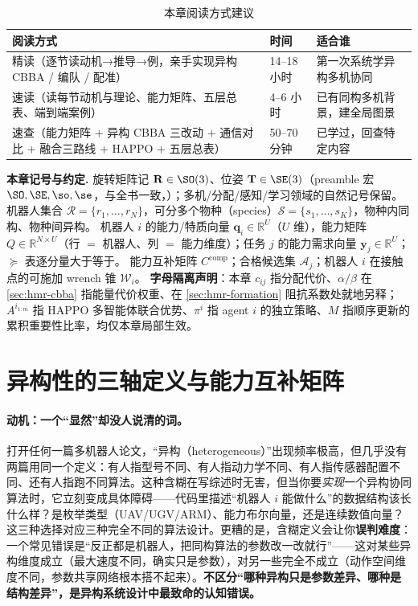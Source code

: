 \begin{table}[H]\centering\small
\caption{本章阅读方式建议}
\label{tab:hmr-reading}
\begin{tabularx}{\linewidth}{LlL}
\toprule
阅读方式 & 时间 & 适合谁 \\
\midrule
精读（逐节读动机→推导→例，亲手实现异构 CBBA / 编队 / 配准） & 14--18 小时 & 第一次系统学异构多机协同 \\
速读（读每节动机与理论、能力矩阵、五层总表、端到端案例） & 4--6 小时 & 已有同构多机背景，建全局图景 \\
速查（能力矩阵 $+$ 异构 CBBA 三改动 $+$ 通信对比 $+$ 融合三路线 $+$ HAPPO $+$ 五层总表） & 50--70 分钟 & 已学过，回查特定内容 \\
\bottomrule
\end{tabularx}
\end{table}

\begin{note}
\textbf{本章记号与约定.}\;
旋转矩阵记 $\mathbf{R}\in\SO(3)$、位姿 $\mathbf{T}\in\SE(3)$（preamble 宏 $\SO,\SE,\so,\se$，与全书一致，）；多机/分配/感知/学习领域的自然记号保留。
机器人集合 $\mathcal{R}=\{r_1,\dots,r_N\}$，可分多个物种（species）$\mathcal{S}=\{s_1,\dots,s_K\}$，物种内同构、物种间异构。
机器人 $i$ 的能力/特质向量 $\mathbf{q}_i\in\mathbb{R}^U$（$U$ 维），能力矩阵 $Q\in\mathbb{R}^{N\times U}$（行 $=$ 机器人、列 $=$ 能力维度）；任务 $j$ 的能力需求向量 $\mathbf{y}_j\in\mathbb{R}^U$；$\succeq$ 表逐分量大于等于。
能力互补矩阵 $C^{\mathrm{comp}}$；合格候选集 $\mathcal{A}_j$；机器人 $i$ 在接触点的可施加 wrench 锥 $\mathcal{W}_i$。
\textbf{字母隔离声明}：本章 $c_{ij}$ 指分配代价、$\alpha/\beta$ 在 \cref{sec:hmr-cbba} 指能量代价权重、在 \cref{sec:hmr-formation} 阻抗系数处就地另释；$A^{i_{1:m}}$ 指 HAPPO 多智能体联合优势、$\pi^i$ 指 agent $i$ 的独立策略、$M$ 指顺序更新的累积重要性比率，均仅本章局部生效。
\end{note}

\section{异构性的三轴定义与能力互补矩阵}
\label{sec:hmr-axes}

\paragraph{动机：一个“显然”却没人说清的词。}
打开任何一篇多机器人论文，“异构（heterogeneous）”出现频率极高，但几乎没有两篇用同一个定义：有人指型号不同、有人指动力学不同、有人指传感器配置不同、还有人指跑不同算法。这种含糊在写综述时无害，但当你要\emph{实现}一个异构协同算法时，它立刻变成具体障碍——代码里描述“机器人 $i$ 能做什么”的数据结构该长什么样？是枚举类型（UAV/UGV/ARM）、能力布尔向量，还是连续数值向量？这三种选择对应三种完全不同的算法设计。更糟的是，含糊定义会让你\textbf{误判难度}：一个常见错误是“反正都是机器人，把同构算法的参数改一改就行”——这对某些异构维度成立（最大速度不同，确实只是参数），对另一些完全不成立（动作空间维度不同，参数共享网络根本搭不起来）。\textbf{不区分“哪种异构只是参数差异、哪种是结构差异”，是异构系统设计中最致命的认知错误。}

